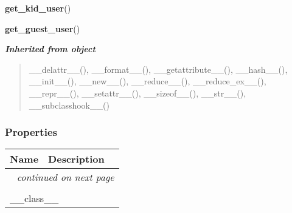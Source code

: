     \label{db_layer:RolType:get_kid_user}

    \vspace{0.5ex}

\hspace{.8\funcindent}\begin{boxedminipage}{\funcwidth}

    \raggedright \textbf{get\_kid\_user}()

\setlength{\parskip}{2ex}
\setlength{\parskip}{1ex}
    \end{boxedminipage}

    \label{db_layer:RolType:get_guest_user}

    \vspace{0.5ex}

\hspace{.8\funcindent}\begin{boxedminipage}{\funcwidth}

    \raggedright \textbf{get\_guest\_user}()

\setlength{\parskip}{2ex}
\setlength{\parskip}{1ex}
    \end{boxedminipage}


\large{\textbf{\textit{Inherited from object}}}

\begin{quote}
\_\_delattr\_\_(), \_\_format\_\_(), \_\_getattribute\_\_(), \_\_hash\_\_(), \_\_init\_\_(), \_\_new\_\_(), \_\_reduce\_\_(), \_\_reduce\_ex\_\_(), \_\_repr\_\_(), \_\_setattr\_\_(), \_\_sizeof\_\_(), \_\_str\_\_(), \_\_subclasshook\_\_()
\end{quote}


  \subsubsection{Properties}

    \vspace{-1cm}
\hspace{\varindent}\begin{longtable}{|p{\varnamewidth}|p{\vardescrwidth}|l}
\cline{1-2}
\cline{1-2} \centering \textbf{Name} & \centering \textbf{Description}& \\
\cline{1-2}
\endhead\cline{1-2}\multicolumn{3}{r}{\small\textit{continued on next page}}\\\endfoot\cline{1-2}
\endlastfoot\multicolumn{2}{|l|}{\textit{Inherited from object}}\\
\multicolumn{2}{|p{\varwidth}|}{\raggedright \_\_class\_\_}\\
\cline{1-2}
\end{longtable}

